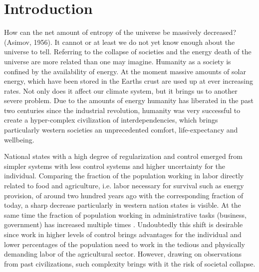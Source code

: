 
\section{Introduction} %

How can the net amount of entropy of the universe be massively decreased? (Asimov, 1956). It cannot or at least we do not yet know enough about the universe to tell. Referring to the collapse of societies and the energy death of the universe are more related than one may imagine. Humanity as a society is confined by the availability of energy. At the moment massive amounts of solar energy, which have been stored in the Earths crust are used up at ever increasing rates. Not only does it affect our climate system, but it brings us to another severe problem. Due to the amounts of energy humanity has liberated in the past two centuries since the industrial revolution, humanity was very successful to create a hyper-complex civilization of interdependencies, which brings particularly western societies an unprecedented comfort, life-expectancy and wellbeing.

National states with a high degree of regularization and control emerged from simpler systems with less control systems and higher uncertainty for the individual. Comparing the fraction of the population working in labor directly related to food and agriculture, i.e. labor necessary for survival such as energy provision, of around two hundred years ago with the corresponding fraction of today, a sharp decrease particularly in western nation states is visible. At the same time the fraction of population working in administrative tasks (business, government) has increased multiple times \cite{??}. Undoubtedly this shift is desirable since work in higher levels of control brings advantages for the individual and lower percentages of the population need to work in the tedious and physically demanding labor of the agricultural sector. However, drawing on observations from past civilizations, such complexity brings with it the risk of societal collapse.

